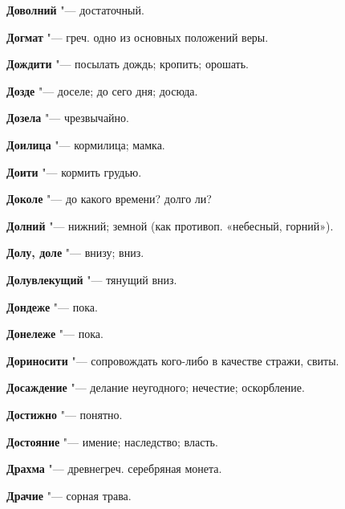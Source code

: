 \begin{mymulticols}{2}
\noindent\textbf{Доволний} "--- достаточный. 




\noindent\textbf{Догмат} "--- греч. одно из основных положений веры. 




\noindent\textbf{Дождити} "--- посылать дождь; кропить; орошать. 




\noindent\textbf{Дозде} "--- доселе; до сего дня; досюда. 




\noindent\textbf{Дозела} "--- чрезвычайно. 




\noindent\textbf{Доилица} "--- кормилица; мамка. 




\noindent\textbf{Доити} "--- кормить грудью. 




\noindent\textbf{Доколе} "--- до какого времени? долго ли? 




\noindent\textbf{Долний} "--- нижний; земной (как противоп. «небесный, горний»). 




\noindent\textbf{Долу, доле} "--- внизу; вниз. 




\noindent\textbf{Долувлекущий} "--- тянущий вниз. 




\noindent\textbf{Дондеже} "--- пока. 




\noindent\textbf{Донележе} "--- пока. 




\noindent\textbf{Дориносити} "--- сопровождать кого-либо в качестве стражи, свиты. 




\noindent\textbf{Досаждение} "--- делание неугодного; нечестие; оскорбление. 




\noindent\textbf{Достижно} "--- понятно. 




\noindent\textbf{Достояние} "--- имение; наследство; власть. 




\noindent\textbf{Драхма} "--- древнегреч. серебряная монета. 




\noindent\textbf{Драчие} "--- сорная трава. 





\end{mymulticols}

